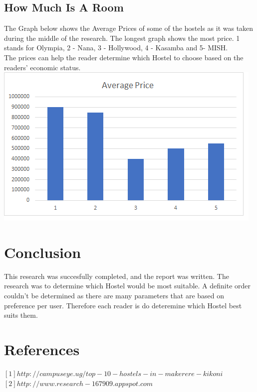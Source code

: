 \documentclass[12pt, a4paper]{article}
\begin{document}
\subsection{How Much Is A Room}
The Graph below shows the Average Prices of some of the hostels as it was taken during the middle of the research. The longest graph shows the most price. 1 stands for Olympia, 2 - Nana, 3 - Hollywood, 4 - Kasamba and 5- MISH.\\
The prices can help the reader determine which Hostel to choose based on the readers' economic status.\\
\includegraphics{Graph}

\section{Conclusion}
This research was succesfully completed, and the report was written. The research was to determine which Hostel would be most suitable. A definite order couldn't be determined as there are many parameters that are  based on preference per user. Therefore each reader is do deteremine which Hostel best suits them.

\newpage
\section{References}
$[1] http://campuseye.ug/top-10-hostels-in-makerere-kikoni$\\
$[2] http://www.research-167909.appspot.com $\\
\end{document}

